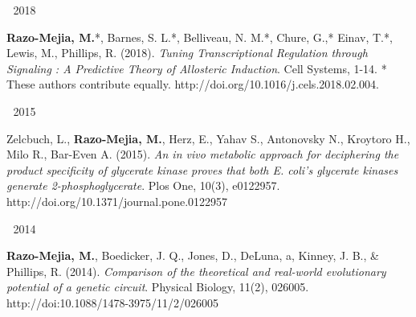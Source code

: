 \begin{cventries}
\cventry
    {$\;$}
    {2018}
    {$\;$}
    {$\;$}
    {
      \begin{cvitems}
        \item {
        \begin{flushleft}
          \textbf{Razo-Mejia, M.}*, Barnes, S. L.*, Belliveau, N. M.*, Chure,
          G.,* Einav, T.*, Lewis, M., Phillips, R. (2018). \textit{Tuning
          Transcriptional Regulation through Signaling : A Predictive Theory of
          Allosteric Induction}. Cell Systems, 1-14. * These authors contribute
          equally. \linebreak
          http://doi.org/10.1016/j.cels.2018.02.004.
        \end{flushleft}
        }
      \end{cvitems}
    }


\cventry
    {$\;$}
    {2015}
    {$\;$}
    {$\;$}
    {
      \begin{cvitems}
        \item {
        \begin{flushleft}
           Zelcbuch, L., \textbf{Razo-Mejia, M.}, Herz, E., Yahav S.,
           Antonovsky N., Kroytoro H., Milo R., Bar-Even A. (2015). \textit{An
           in vivo metabolic approach for deciphering the product specificity
           of glycerate kinase proves that both E. coli's glycerate kinases
           generate 2-phosphoglycerate}. Plos One, 10(3), e0122957.\linebreak
           http://doi.org/10.1371/journal.pone.0122957
        \end{flushleft}
        }
      \end{cvitems}
    }
\cventry
    {$\;$}
    {2014}
    {$\;$}
    {$\;$}
    {
      \begin{cvitems}
        \item {
        \begin{flushleft}
           \textbf{Razo-Mejia, M.}, Boedicker, J. Q., Jones, D., DeLuna, a,
           Kinney, J. B., \& Phillips, R. (2014). \textit{Comparison of the
           theoretical and real-world evolutionary potential of a genetic
           circuit}. Physical Biology, 11(2), 026005.\linebreak
           http://doi:10.1088/1478-3975/11/2/026005
        \end{flushleft}
        }
      \end{cvitems}
    }


\end{cventries}
